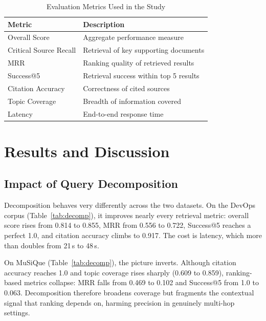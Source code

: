 \documentclass[conference]{IEEEtran}
\begin{document}
\begin{table}[t]
\caption{Evaluation Metrics Used in the Study}
\label{tab:metrics}
\centering
\renewcommand{\arraystretch}{1.2}
\begin{tabular}{@{}ll@{}}
\toprule
\textbf{Metric} & \textbf{Description} \\
\midrule
Overall Score          & Aggregate performance measure \\
Critical Source Recall & Retrieval of key supporting documents \\
MRR                    & Ranking quality of retrieved results \\
Success@5              & Retrieval success within top 5 results \\
Citation Accuracy      & Correctness of cited sources \\
Topic Coverage         & Breadth of information covered \\
Latency                & End-to-end response time \\
\bottomrule
\end{tabular}
\end{table}

\section{Results and Discussion}
\subsection{Impact of Query Decomposition}
Decomposition behaves very differently across the two datasets. On the DevOps corpus (Table~\ref{tab:decomp}), it improves nearly every retrieval metric: overall score rises from 0.814 to 0.855, MRR from 0.556 to 0.722, Success@5 reaches a perfect 1.0, and citation accuracy climbs to 0.917. The cost is latency, which more than doubles from 21\,s to 48\,s.

On MuSiQue (Table~\ref{tab:decomp}), the picture inverts. Although citation accuracy reaches 1.0 and topic coverage rises sharply (0.609 to 0.859), ranking-based metrics collapse: MRR falls from 0.469 to 0.102 and Success@5 from 1.0 to 0.063. Decomposition therefore broadens coverage but fragments the contextual signal that ranking depends on, harming precision in genuinely multi-hop settings.
\end{document}
